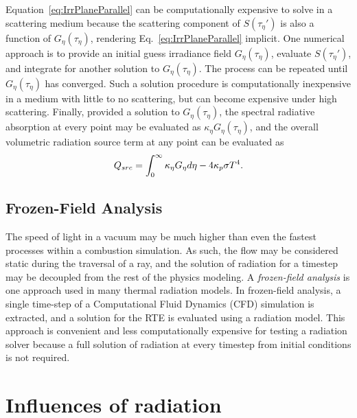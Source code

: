 Equation~\ref{eq:IrrPlaneParallel} can be computationally expensive to solve in a scattering medium because the scattering component of $S(\tau{}_\eta')$ is also a function of $G_\eta(\tau_\eta)$, rendering Eq.~\ref{eq:IrrPlaneParallel} implicit. One numerical approach is to provide an initial guess irradiance field $G_\eta(\tau_\eta)$, evaluate $S(\tau{}_\eta')$, and integrate for another solution to $G_\eta(\tau_\eta)$. The process can be repeated until $G_\eta(\tau_\eta)$ has converged. Such a solution procedure is computationally inexpensive in a medium with little to no scattering, but can become expensive under high scattering.
Finally, provided a solution to $G_\eta{}(\tau_\eta)$, the spectral radiative absorption at every point may be evaluated as $\kappa{}_\eta{}G_\eta{}(\tau_\eta)$, and the overall volumetric radiation source term at any point can be evaluated as 
\begin{equation}
    \centering
    Q_{src}=\int_0^\infty{}\kappa{}_\eta{}G_\eta{}d\eta{}-4\kappa_p\sigma{}T^4 .
    \label{eq:RadSrcPP}
\end{equation}


\subsection{Frozen-Field Analysis}
The speed of light in a vacuum may be much higher than even the fastest processes within a combustion simulation. As such, the flow may be considered static during the traversal of a ray, and the solution of radiation for a timestep may be decoupled from the rest of the physics modeling.
A \textit{frozen-field analysis} is one approach used in many thermal radiation models. In frozen-field analysis, a single time-step of a Computational Fluid Dynamics (CFD) simulation is extracted, and a solution for the RTE is evaluated using a radiation model. 
This approach is convenient and less computationally expensive for testing a radiation solver because a full solution of radiation at every timestep from initial conditions is not required.

\section{Influences of radiation}

